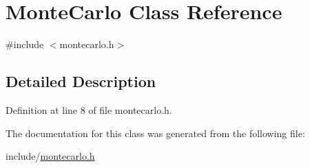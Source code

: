 \hypertarget{classMonteCarlo}{\section{Monte\-Carlo Class Reference}
\label{classMonteCarlo}
}


{\ttfamily \#include $<$montecarlo.\-h$>$}



\subsection{Detailed Description}


Definition at line 8 of file montecarlo.\-h.



The documentation for this class was generated from the following file\-:\begin{DoxyCompactItemize}
\item 
include/\hyperlink{montecarlo_8h}{montecarlo.\-h}\end{DoxyCompactItemize}

